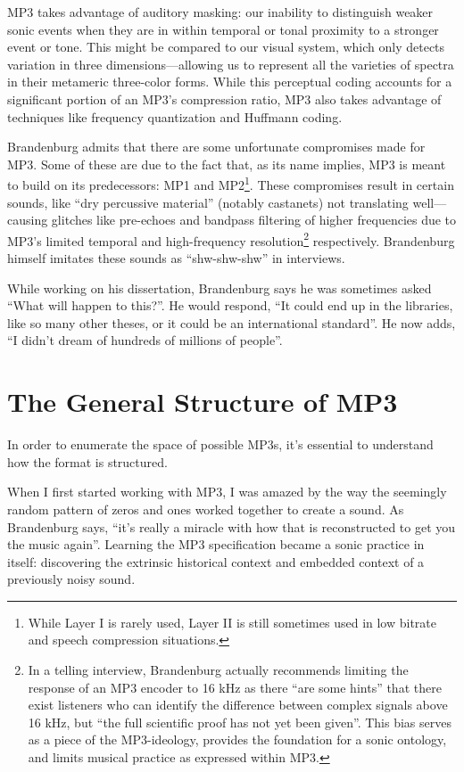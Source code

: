 \documentclass{thesis}
\begin{document}
MP3 takes advantage of auditory masking: our inability to distinguish weaker sonic events when they are in within temporal or tonal proximity to a stronger event or tone.\cite{Ruckert05} This might be compared to our visual system, which only detects variation in three dimensions---allowing us to represent all the varieties of spectra in their metameric three-color forms. While this perceptual coding accounts for a significant portion of an MP3's compression ratio, MP3 also takes advantage of techniques like frequency quantization and Huffmann coding.

Brandenburg admits that there are some unfortunate compromises made for MP3. Some of these are due to the fact that, as its name implies, MP3 is meant to build on its predecessors: MP1 and MP2\footnote{While Layer I is rarely used, Layer II is still sometimes used in low bitrate and speech compression situations.}. These compromises result in certain sounds, like ``dry percussive material'' (notably castanets) not translating well\cite{karlheinz_brandenburg_mp3_1999}---causing glitches like pre-echoes and bandpass filtering of higher frequencies due to MP3's limited temporal and high-frequency resolution\footnote{In a telling interview, Brandenburg actually recommends limiting the response of an MP3 encoder to 16 kHz as there ``are some hints'' that there exist listeners who can identify the difference between complex signals above 16 kHz, but ``the full scientific proof has not yet been given''.\cite[10]{karlheinz_brandenburg_mp3_1999} This bias serves as a piece of the MP3-ideology, provides the foundation for a sonic ontology, and limits musical practice as expressed within MP3.} respectively. Brandenburg himself imitates these sounds as ``shw-shw-shw'' in interviews.

While working on his dissertation, Brandenburg says he was sometimes asked ``What will happen to this?''. He would respond, ``It could end up in the libraries, like so many other theses, or it could be an international standard''. He now adds, ``I didn't dream of hundreds of millions of people''.
	
\section{The General Structure of MP3}

In order to enumerate the space of possible MP3s, it's essential to understand how the format is structured.

When I first started working with MP3, I was amazed by the way the seemingly random pattern of zeros and ones worked together to create a sound. As Brandenburg says, ``it's really a miracle with how that is reconstructed to get you the music again''\cite{tom_merritt_real_2010}. Learning the MP3 specification became a sonic practice in itself: discovering the extrinsic historical context and embedded context of a previously noisy sound.
\end{document}
